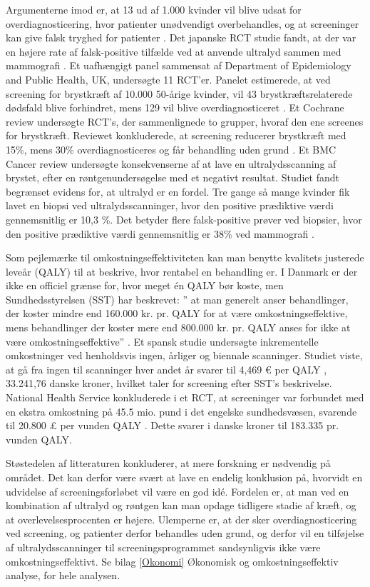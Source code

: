 Argumenterne imod er, at 13 ud af 1.000 kvinder vil blive udsat for overdiagnosticering, hvor patienter unødvendigt overbehandles, og at screeninger kan give falsk tryghed for patienter \cite{Argumenter}. Det japanske RCT studie fandt, at der var en højere rate af falsk-positive tilfælde ved at anvende ultralyd sammen med mammografi \cite{Japan}. Et uafhængigt panel sammensat af Department of Epidemiology and Public Health, UK, undersøgte 11 RCT’er. Panelet estimerede, at ved screening for brystkræft af 10.000 50-årige kvinder, vil 43 brystkræftsrelaterede dødsfald blive forhindret, mens 129 vil blive overdiagnosticeret \cite{Panel}. Et Cochrane review undersøgte RCT’s, der sammenlignede to grupper, hvoraf den ene screenes for brystkræft. Reviewet konkluderede, at screening reducerer brystkræft med 15\%, mens 30\% overdiagnosticeres og får behandling uden grund \cite{Gotzche}. Et BMC Cancer review undersøgte konsekvenserne af at lave en ultralydsscanning af brystet, efter en røntgenundersøgelse med et negativt resultat. Studiet fandt begrænset evidens for, at ultralyd er en fordel. Tre gange så mange kvinder fik lavet en biopsi ved ultralydsscanninger, hvor den positive prædiktive værdi gennemsnitlig er 10,3 \%. Det betyder flere falsk-positive prøver ved biopsier, hvor den positive prædiktive værdi gennemsnitlig er 38\% ved mammografi \cite{DenseBreast}. 

Som pejlemærke til omkostningseffektiviteten kan man benytte kvalitets justerede leveår (QALY) til at beskrive, hvor rentabel en behandling er. I Danmark er der ikke en officiel grænse for, hvor meget én QALY bør koste, men Sundhedsstyrelsen (SST) har beskrevet: ” at man generelt anser behandlinger, der koster mindre end 160.000 kr. pr. QALY for at være omkostningseffektive, mens behandlinger der koster mere end 800.000 kr. pr. QALY anses for ikke at være omkostningseffektive” \cite{QALY}. Et spansk studie undersøgte inkrementelle omkostninger ved henholdsvis ingen, årliger og biennale scanninger. Studiet viste, at gå fra ingen til scanninger hver andet år svarer til 4,469 € per QALY \cite{SpanskStudie}, 33.241,76 danske kroner, hvilket taler for screening efter SST's beskrivelse. National Health Service konkluderede i et RCT, at screeninger var forbundet med en ekstra omkostning på 45.5 mio. pund i det engelske sundhedsvæsen, svarende til 20.800 £ per vunden QALY \cite{NHS}. Dette svarer i danske kroner til 183.335 pr. vunden QALY.  

Støstedelen af litteraturen konkluderer, at mere forskning er nødvendig på området. Det kan derfor være svært at lave en endelig konklusion på, hvorvidt en udvidelse af screeningsforløbet vil være en god idé. Fordelen er, at man ved en kombination af ultralyd og røntgen kan man opdage tidligere stadie af kræft, og at overlevelsesprocenten er højere. Ulemperne er, at der sker overdiagnosticering ved screening, og patienter derfor behandles uden grund, og derfor vil en tilføjelse af ultralydsscanninger til screeningsprogrammet sandsynligvis ikke være omkostningseffektivt. Se bilag \ref{Okonomi} Økonomisk og omkostningseffektiv analyse, for hele analysen. 
